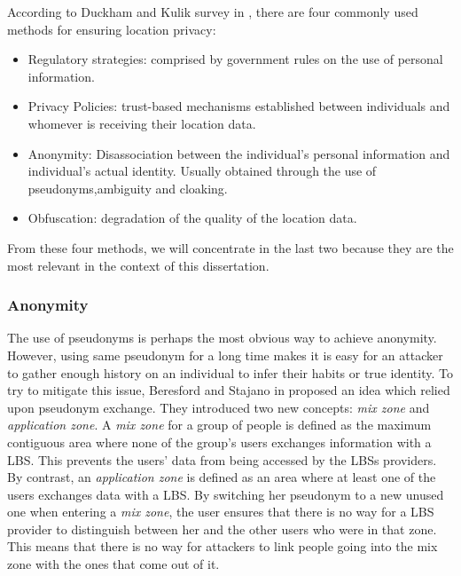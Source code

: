 According to Duckham and Kulik survey in \cite{duckham2006location},
there are four commonly used methods for ensuring location privacy:
\begin{itemize}
\item Regulatory strategies: comprised by government rules on the use
  of personal information.
\item Privacy Policies: trust-based mechanisms established
  between individuals and whomever is receiving their location data.
\item Anonymity: Disassociation between the individual's personal
  information and individual's actual identity. Usually obtained through
  the use of pseudonyms,ambiguity and cloaking.
\item Obfuscation: degradation of the quality of the location data.
\end{itemize}

From these four methods, we will concentrate in the last two because
they are the most relevant in the context of this dissertation.

\subsubsection{Anonymity}
\label{sec:privacy_anonimity}

The use of pseudonyms is perhaps the most obvious way to achieve
anonymity. However, using same pseudonym for a long time makes it is
easy for an attacker to gather enough history on an individual to
infer their habits or true identity. To try to mitigate this issue,
Beresford and Stajano in \cite{1186725} proposed an idea which relied
upon pseudonym exchange. They introduced two new concepts: \emph{mix
  zone} and \emph{application zone}. A \emph{mix zone} for a group of
people is defined as the maximum contiguous area where none of the
group's users exchanges information with a LBS. This prevents the
users' data from being accessed by the LBSs providers. By contrast, an
\emph{application zone} is defined as an area where at least one of
the users exchanges data with a LBS. By switching her pseudonym to a
new unused one when entering a \emph{mix zone}, the user ensures that
there is no way for a LBS provider to distinguish between her and the
other users who were in that zone. This means that there is no way for
attackers to link people going into the mix zone with the ones that
come out of it.

